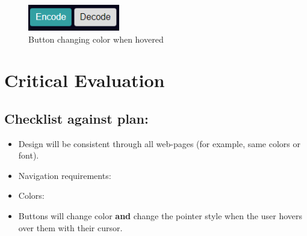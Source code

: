 \documentclass[10pt, a4paper]{article}
\newcommand{\cmark}{\ding{51}}%
\newcommand{\done}{\rlap{$\square$}{\raisebox{2pt}{\large\hspace{1pt}\cmark}}%
\hspace{-2.5pt}}
\begin{document}
    \begin{figure}[H]
    \centering
    \includegraphics[width=40mm]{images/button_hover.png}
    \caption{Button changing color when hovered}
    \end{figure}


\pagebreak
    \section{Critical Evaluation}
    \subsection{Checklist against plan:} 
        \begin{itemize}   
    \item[\done] Design will be consistent through all web-pages (for example, same colors or font).
    \item Navigation requirements: 
 \item Colors:
    \item[\done] Buttons will change color \textbf{and} change the pointer style when the user hovers over them with their cursor. 
        \end{itemize}


    
\end{document}
